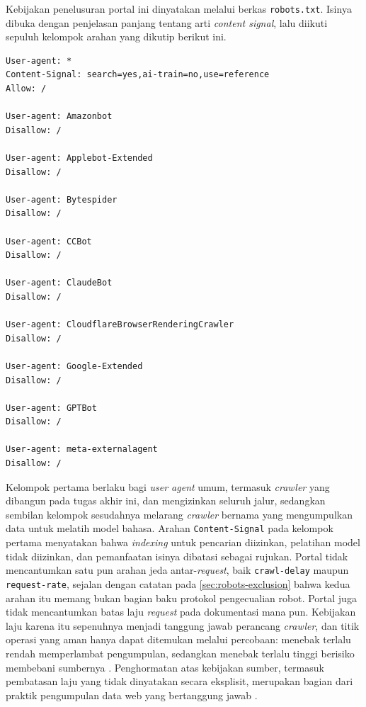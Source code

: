 Kebijakan penelusuran portal ini dinyatakan melalui berkas \texttt{robots.txt}.
Isinya dibuka dengan penjelasan panjang tentang arti \textit{content signal}, lalu diikuti sepuluh kelompok arahan yang dikutip berikut ini.

\par\vspace{0.85\baselineskip}
\begingroup
\setlength{\parskip}{0pt}
\setlength{\topsep}{0pt}
\setlength{\partopsep}{0pt}
\singlespacing
\small
\begin{verbatim}
User-agent: *
Content-Signal: search=yes,ai-train=no,use=reference
Allow: /

User-agent: Amazonbot
Disallow: /

User-agent: Applebot-Extended
Disallow: /

User-agent: Bytespider
Disallow: /

User-agent: CCBot
Disallow: /

User-agent: ClaudeBot
Disallow: /

User-agent: CloudflareBrowserRenderingCrawler
Disallow: /

User-agent: Google-Extended
Disallow: /

User-agent: GPTBot
Disallow: /

User-agent: meta-externalagent
Disallow: /
\end{verbatim}
\endgroup
\vspace{0.15\baselineskip}

Kelompok pertama berlaku bagi \textit{user agent} umum, termasuk \textit{crawler} yang dibangun pada tugas akhir ini, dan mengizinkan seluruh jalur, sedangkan sembilan kelompok sesudahnya melarang \textit{crawler} bernama yang mengumpulkan data untuk melatih model bahasa.
Arahan \texttt{Content-Signal} pada kelompok pertama menyatakan bahwa \textit{indexing} untuk pencarian diizinkan, pelatihan model tidak diizinkan, dan pemanfaatan isinya dibatasi sebagai rujukan.
Portal tidak mencantumkan satu pun arahan jeda antar-\textit{request}, baik \texttt{crawl-delay} maupun \texttt{request-rate}, sejalan dengan catatan pada \autoref{sec:robots-exclusion} bahwa kedua arahan itu memang bukan bagian baku protokol pengecualian robot.
Portal juga tidak mencantumkan batas laju \textit{request} pada dokumentasi mana pun.
Kebijakan laju karena itu sepenuhnya menjadi tanggung jawab perancang \textit{crawler}, dan titik operasi yang aman hanya dapat ditemukan melalui percobaan: menebak terlalu rendah memperlambat pengumpulan, sedangkan menebak terlalu tinggi berisiko membebani sumbernya \parencites{olston2010webcrawling}{kolobov2019politeness}.
Penghormatan atas kebijakan sumber, termasuk pembatasan laju yang tidak dinyatakan secara eksplisit, merupakan bagian dari praktik pengumpulan data web yang bertanggung jawab \parencites{krotov2020webscraping}{brown2024webscraping}.

